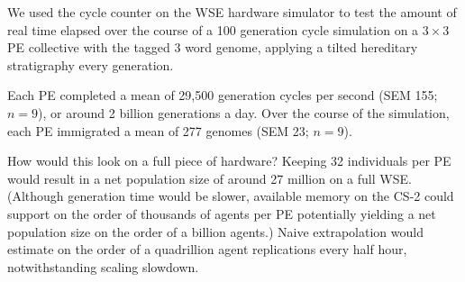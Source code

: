 We used the cycle counter on the WSE hardware simulator to test the amount of real time elapsed over the course of a 100 generation cycle simulation on a $3\times3$ PE collective with the tagged 3 word genome, applying a tilted hereditary stratigraphy every generation.

Each PE completed a mean of 29,500 generation cycles per second (SEM 155; $n=9$), or around 2 billion generations a day.
Over the course of the simulation, each PE immigrated a mean of 277 genomes (SEM 23; $n=9$).

How would this look on a full piece of hardware?
Keeping 32 individuals per PE would result in a net population size of around 27 million on a full WSE.
(Although generation time would be slower, available memory on the CS-2 could support on the order of thousands of agents per PE potentially yielding a net population size on the order of a billion agents.)
Naive extrapolation would estimate on the order of a quadrillion agent replications every half hour, notwithstanding scaling slowdown.

